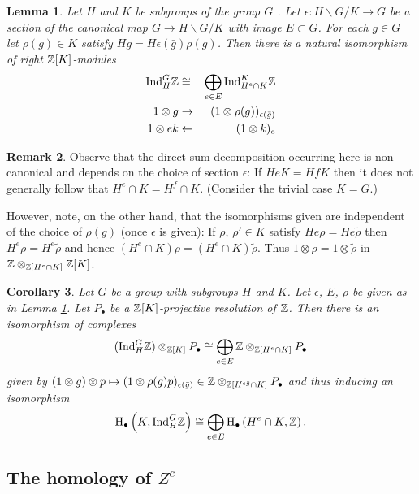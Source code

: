 \documentclass[12pt]{amsart}
\newtheorem{lem}{Lemma}[section]
\newtheorem{cor}[lem]{Corollary}
\theoremstyle{definition}
\newtheorem{rem}[lem]{Remark}
\newcommand{\Z}{\Bbb{Z}}
\newcommand{\<}{\langle}
\renewcommand{\>}{\rangle}
\newcommand{\ho}[3]{\mathrm{H}_{#1}\left( #2,#3 \right)}
\newcommand{\Ind}[3]{\mathrm{Ind}_{#1}^{#2}#3}
\begin{document}
\begin{lem}\label{lem:permmod} Let $H$ and $K$ be  subgroups of the group $G$ . Let $\epsilon:H\backslash G/K\to G$ be a section 
of the canonical map $G\to H\backslash G/K$ with image $E\subset G$. For each $g\in G$ let $\rho(g)\in K$ satisfy $Hg=H\epsilon(\bar{g}){\rho(g)}$. Then there is a natural isomorphism 
of right $\Z[K]$-modules 
\begin{eqnarray*}
\mathrm{Ind}_H^G\Z& \cong &\bigoplus_{e\in E}\mathrm{Ind}^K_{H^e\cap K}\Z\\
1\otimes g&\rightarrow& (1\otimes \rho(g))_{\epsilon(\bar{g})}\\
1\otimes e{k}&\leftarrow& (1\otimes k)_e\\
\end{eqnarray*}
\end{lem}

\begin{rem}\label{rem:erho} Observe that the direct sum decomposition occurring here is non-canonical and depends on the choice of section $\epsilon$:
If $HeK=HfK$ then it does not generally follow that $H^e\cap K=H^{f}\cap K$. (Consider the trivial case $K=G$.)

However, note, on the other hand, that the isomorphisms given are  independent of the choice of $\rho(g)$ (once $\epsilon$ is given): If $\rho$, $\rho'\in K$ satisfy
$He\rho=He\tilde{\rho}$ then $H^e\rho=H^e\tilde{\rho}$ and hence $(H^e\cap K)\rho=(H^e\cap K)\tilde{\rho}$. Thus $1\otimes \rho=1\otimes \tilde{\rho}$ in $\Z\otimes_{\Z[H^e\cap K]}\Z[K]$.
\end{rem}
\begin{cor}\label{cor:shapiro} Let $G$ be a group with subgroups $H$ and $K$. Let $\epsilon$, $E$, $\rho$ be given as in Lemma \ref{lem:permmod}. Let $P_\bullet$ be a $\Z[K]$-projective 
resolution of $\Z$. Then there is an isomorphism of complexes 
\[
(\Ind{H}{G}{\Z})\otimes_{\Z[K]}P_\bullet\cong \bigoplus_{e\in E}\Z\otimes_{\Z[H^e\cap K]}P_\bullet
\]
given by $(1\otimes g)\otimes p\mapsto (1\otimes\rho(g)p)_{\epsilon(\bar{g})}\in \Z\otimes_{\Z[H^{\epsilon{\bar{g}}}\cap K]}P_\bullet$ and thus  inducing an isomorphism
\[
\ho{\bullet}{K}{\Ind{H}{G}{\Z}}\cong\bigoplus_{e\in E}\ho{\bullet}{H^e\cap K}{\Z}.
\]
\end{cor}

\subsection{The homology of $Z^c$}
\end{document}
